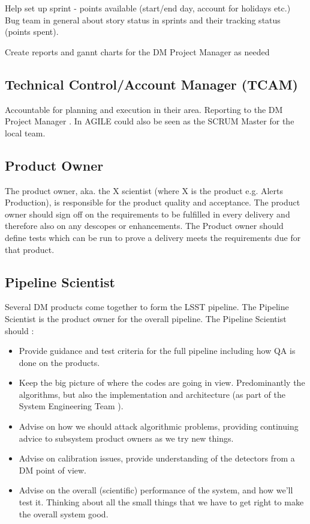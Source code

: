 Help set up sprint - points available (start/end day, account for holidays etc.) 
Bug team in general about story status in sprints and their tracking status (points spent).

Create reports and gannt charts for the DM Project Manager as needed 
\subsection{Technical Control/Account Manager (TCAM) \label{role:tcam} }
Accountable for planning and execution in their area. Reporting to the DM Project Manager . In AGILE could also be seen as the SCRUM Master for the local team.

\subsection{ Product Owner \label{role:prodo}}
The product owner, aka. the X scientist (where X is the product e.g. Alerts Production), is responsible for the product quality and acceptance. 
The product owner should sign off on the requirements to be fulfilled in every delivery and therefore also on any descopes or enhancements. 
The Product owner should define tests which can be run to prove a delivery meets the requirements due for that product. 

\subsection{Pipeline Scientist \label{role:pipe}}
Several DM products come together to form the LSST pipeline. The Pipeline Scientist is the product owner for the overall pipeline. 
The Pipeline Scientist should :
\begin{itemize}
\item  Provide guidance and test criteria for the full pipeline including how QA is done on the products.  
\item Keep the big picture of where the codes are going in view. Predominantly the algorithms, but also the implementation and architecture (as part of the System Engineering Team ).


\item Advise on how we should attack algorithmic problems,  
providing continuing advice to subsystem product owners as we try new things. 

\item Advise on calibration issues, provide understanding of the detectors from a DM point of view. 

\item Advise on the overall (scientific) performance of the system, and how we'll test it.  Thinking about all the small things that we have to get right to make the overall system good.



\end{itemize}


